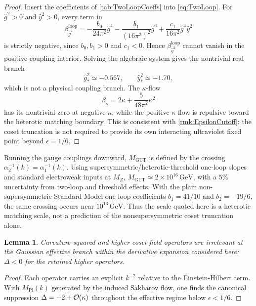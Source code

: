 \documentclass[pdflatex,sn-mathphys-num]{sn-jnl}
\theoremstyle{thmstyleone}
\newtheorem{lemma}[lemma]{Lemma}
\theoremstyle{thmstylethree}%
\theoremstyle{thmstyletwo}%
\begin{document}
\begin{proof}
Insert the coefficients of \autoref{tab:TwoLoopCoeffs} into
\eqref{eq:TwoLoop}. For \(\hat g^{2}>0\) and \(\hat y^{2}>0\), every term in
\[
\beta_{\hat g^{2}}^{\mathrm{loop}}
 = -\frac{b_{0}}{24\pi^{2}}\hat g^{4}
   -\frac{b_{1}}{(16\pi^{2})^{2}}\hat g^{6}
   +\frac{c_{1}}{16\pi^{2}}\hat g^{4}\hat y^{2}
\]
is strictly negative, since \(b_{0},b_{1}>0\) and \(c_{1}<0\). Hence
\(\beta_{\hat g^{2}}^{\mathrm{loop}}\) cannot vanish in the positive-coupling interior.
Solving the algebraic system gives the nontrivial real branch
\[
  \hat g^{2}_{\ast}\simeq -0.567,
  \qquad
  \hat y^{2}_{\ast}\simeq -1.70,
\]
which is not a physical coupling branch. The \(\kappa\)-flow
\[
  \beta_{\kappa}=2\kappa+\frac{5}{48\pi^{2}}\kappa^{2}
\]
has its nontrivial zero at negative \(\kappa\), while the positive-\(\kappa\)
flow is repulsive toward the heterotic matching boundary. This is consistent
with \autoref{rmk:EpsilonCutoff}: the coset truncation is not required to
provide its own interacting ultraviolet fixed point beyond \(\epsilon=1/6\).
\end{proof}

Running the gauge couplings downward,
\(M_{\mathrm{GUT}}\) is defined by the crossing
\(
  \alpha_{2}^{-1}(k)=\alpha_{1}^{-1}(k)
\).
Using supersymmetric/heterotic-threshold one-loop slopes and standard
electroweak inputs at $M_{Z}$,
\(
  M_{\mathrm{GUT}}\simeq2\times10^{16}\,\mathrm{GeV}
\),
with a $5\%$ uncertainty from two-loop and threshold effects.
With the plain non-supersymmetric Standard-Model one-loop coefficients
\(b_{1}=41/10\) and \(b_{2}=-19/6\), the same crossing occurs near
\(10^{13}\,\mathrm{GeV}\). Thus the scale quoted here is a heterotic matching
scale, not a prediction of the nonsupersymmetric coset truncation alone.

\begin{lemma}\label{lem:Irrel}
Curvature-squared and higher coset-field operators are irrelevant at
the Gaussian effective branch within the derivative expansion considered here:
\(
  \Delta<0
\)
for the retained higher operators.
\end{lemma}

\begin{proof}
Each operator carries an explicit $k^{-2}$ relative to the
Einstein-Hilbert term.  With
\(M_{\mathrm{Pl}}(k)\) generated by the induced Sakharov flow, one finds the
canonical suppression \(\Delta=-2+{\cal O}(\kappa)\) throughout the effective
regime below \(\epsilon<1/6\).
\end{proof}
\end{document}
